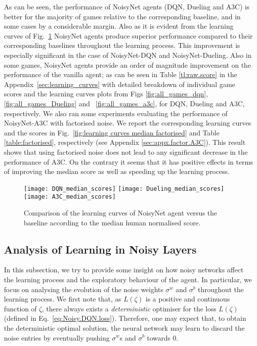 \documentclass{article}
\newcommand{\algoinit}{NoisyNet}
\begin{document}
As can be seen, the performance of \algoinit{} agents (DQN, Dueling and A3C) is better for the majority of games relative to the corresponding baseline, and in some cases by a considerable margin. Also as it is evident from the learning curves of Fig.~\ref{fig:learning curves median}  NoisyNet agents produce superior performance compared to their corresponding baselines throughout the learning process. This improvement is especially significant in the case of NoisyNet-DQN and NoisyNet-Dueling. Also in some games, \algoinit{} agents provide an order of magnitude improvement on the performance of the vanilla agent; as can be seen in Table \ref{tl:raw.score} in the Appendix~\ref{sec:learning_curves} with detailed breakdown of individual game scores and the learning curves plots from Figs \ref{fig:all_games_dqn}, \ref{fig:all_games_Dueling} and ~\ref{fig:all_games_a3c}, for DQN, Dueling and A3C,  respectively.
We also ran some experiments evaluating the performance of NoisyNet-A3C with factorised noise. We report the corresponding learning curves and the scores in Fig.~\ref{fig:learning curves median factorised} and Table \ref{table:factorised}, respectively (see Appendix \ref{sec:appx.factor.A3C}). This result shows that using factorised noise does not lead to any significant decrease in the performance of A3C. On the contrary it seems that it has positive effects in terms of improving the median score as well as speeding up the learning process. 
\begin{centering}
\begin{figure}[htp!]
    \texttt{[image: DQN\_median\_scores]}
    \texttt{[image: Dueling\_median\_scores]}
    \texttt{[image: A3C\_median\_scores]}
    \caption{Comparison of the learning curves of \algoinit{} agent versus the baseline according to the median human normalised score.}
    \label{fig:learning curves median} 
\end{figure}
\end{centering} 
\subsection{Analysis of Learning in Noisy Layers}
In this subsection, we try to provide some insight on how noisy networks affect the learning process and the exploratory behaviour of the agent. In particular, we  focus on analysing the evolution of the noise weights  $\sigma^w$ and $\sigma^b$ throughout the learning process. We first note that, as $L(\zeta)$ is a positive and continuous function of $\zeta$, there always exists a \emph{deterministic} optimiser for the loss $L(\zeta)$ (defined in Eq.~\eqref{eq:Noisy.DQN.loss}). Therefore, one may expect that, to obtain the deterministic optimal solution, the neural network may learn to discard the noise entries by eventually pushing $\sigma^w$s and $\sigma^b$ towards $0$. 
\end{document}

